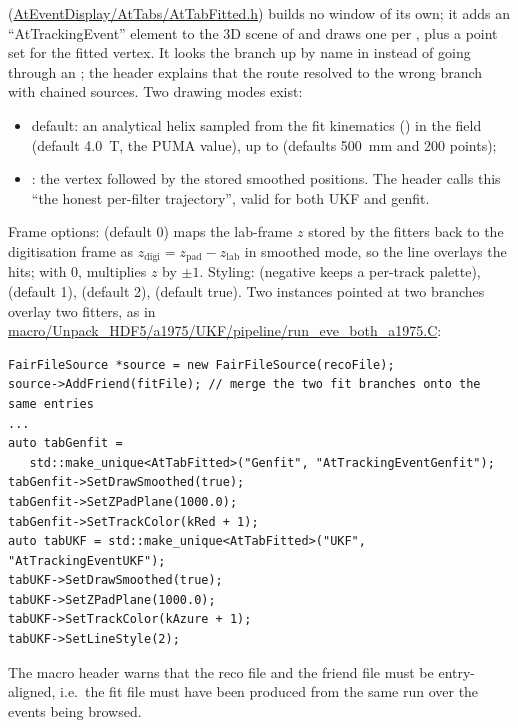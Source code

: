 (\url{AtEventDisplay/AtTabs/AtTabFitted.h}) builds no window of its own; it adds an
``AtTrackingEvent'' element to the 3D scene of  and draws one 
per , plus a point set for the fitted vertex. It looks the branch up by name
in  instead of going through an ; the header explains that
the  route resolved to the wrong branch with chained sources. Two drawing modes
exist:
\begin{itemize}
  \item default: an analytical helix sampled from the fit kinematics
        () in the field  (default 4.0~T, the PUMA value),
        up to  (defaults 500~mm and 200 points);
  \item {}: the vertex followed by the stored smoothed positions. The
        header calls this ``the honest per-filter trajectory'', valid for both UKF and genfit.
\end{itemize}
Frame options:  (default 0) maps the lab-frame $z$ stored by the fitters
back to the digitisation frame as $z_\mathrm{digi} = z_\mathrm{pad} - z_\mathrm{lab}$ in
smoothed mode, so the line overlays the hits; with 0,  multiplies $z$ by
$\pm1$. Styling:  (negative keeps a per-track palette),
 (default 1),  (default 2),  (default
true). Two instances pointed at two branches overlay two fitters, as in
\url{macro/Unpack_HDF5/a1975/UKF/pipeline/run_eve_both_a1975.C}:
\begin{verbatim}
FairFileSource *source = new FairFileSource(recoFile);
source->AddFriend(fitFile); // merge the two fit branches onto the same entries
...
auto tabGenfit =
   std::make_unique<AtTabFitted>("Genfit", "AtTrackingEventGenfit");
tabGenfit->SetDrawSmoothed(true);
tabGenfit->SetZPadPlane(1000.0);
tabGenfit->SetTrackColor(kRed + 1);
auto tabUKF = std::make_unique<AtTabFitted>("UKF", "AtTrackingEventUKF");
tabUKF->SetDrawSmoothed(true);
tabUKF->SetZPadPlane(1000.0);
tabUKF->SetTrackColor(kAzure + 1);
tabUKF->SetLineStyle(2);
\end{verbatim}
The macro header warns that the reco file and the friend file must be entry-aligned, i.e.\ the fit
file must have been produced from the same run over the events being browsed.

